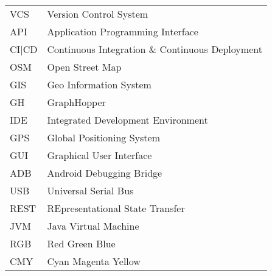 \begin{singlespace}
\begin{flushleft}
\begin{longtable}{p{2 cm}p{14 cm}}
  VCS & Version Control System \\
  API & Application Programming Interface \\
  CI|CD & Continuous Integration \& Continuous Deployment \\
  OSM & Open Street Map \\
  GIS & Geo Information System \\
  GH & GraphHopper \\
  IDE & Integrated Development Environment \\
  GPS & Global Positioning System \\
  GUI & Graphical User Interface \\	
  ADB & Android Debugging Bridge \\
  USB & Universal Serial Bus \\
  REST & REpresentational State Transfer \\
  JVM & Java Virtual Machine \\
  RGB & Red Green Blue \\
  CMY & Cyan Magenta Yellow
\end{longtable}
\end{flushleft}
\end{singlespace}